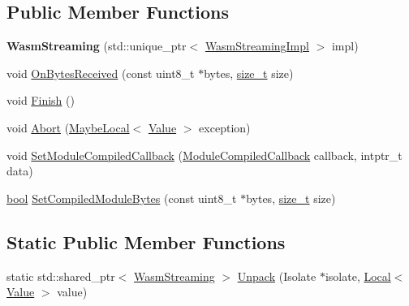 \subsection*{Public Member Functions}
\begin{DoxyCompactItemize}
\item 
\mbox{\label{classv8_1_1WasmStreaming_a40fe20bbbe84a244ebd306da4b8ce256}} 
{\bfseries Wasm\+Streaming} (std\+::unique\+\_\+ptr$<$ \mbox{\hyperlink{classv8_1_1WasmStreaming_1_1WasmStreamingImpl}{Wasm\+Streaming\+Impl}} $>$ impl)
\item 
void \mbox{\hyperlink{classv8_1_1WasmStreaming_ada886a06f191ac65897763bda60c2f54}{On\+Bytes\+Received}} (const uint8\+\_\+t $\ast$bytes, \mbox{\hyperlink{classsize__t}{size\+\_\+t}} size)
\item 
void \mbox{\hyperlink{classv8_1_1WasmStreaming_a2c40c85c34643af871577ea98d792de6}{Finish}} ()
\item 
void \mbox{\hyperlink{classv8_1_1WasmStreaming_aca7399d97368360079e3030b2fb4fc94}{Abort}} (\mbox{\hyperlink{classv8_1_1MaybeLocal}{Maybe\+Local}}$<$ \mbox{\hyperlink{classv8_1_1Value}{Value}} $>$ exception)
\item 
void \mbox{\hyperlink{classv8_1_1WasmStreaming_a3ab2155ed7ae2cce343e634aa46e906b}{Set\+Module\+Compiled\+Callback}} (\mbox{\hyperlink{classv8_1_1WasmStreaming_a2e8af849348cbd9fe9c3940ab010917d}{Module\+Compiled\+Callback}} callback, intptr\+\_\+t data)
\item 
\mbox{\hyperlink{classbool}{bool}} \mbox{\hyperlink{classv8_1_1WasmStreaming_a73a233057ae54177e84d259f43a1781e}{Set\+Compiled\+Module\+Bytes}} (const uint8\+\_\+t $\ast$bytes, \mbox{\hyperlink{classsize__t}{size\+\_\+t}} size)
\end{DoxyCompactItemize}
\subsection*{Static Public Member Functions}
\begin{DoxyCompactItemize}
\item 
static std\+::shared\+\_\+ptr$<$ \mbox{\hyperlink{classv8_1_1WasmStreaming}{Wasm\+Streaming}} $>$ \mbox{\hyperlink{classv8_1_1WasmStreaming_af90e13f9116c9c4184b6e621c87671c6}{Unpack}} (Isolate $\ast$isolate, \mbox{\hyperlink{classv8_1_1Local}{Local}}$<$ \mbox{\hyperlink{classv8_1_1Value}{Value}} $>$ value)
\end{DoxyCompactItemize}


